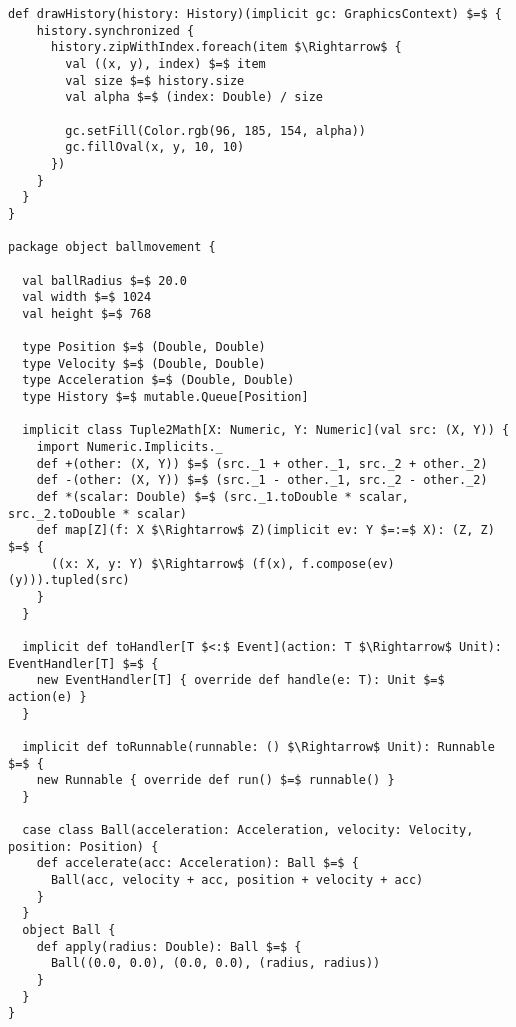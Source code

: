 \begin{lstlisting}[style=ScalaStyle, caption={Ball movement control}, label={lst:ball-full}]
  def drawHistory(history: History)(implicit gc: GraphicsContext) $=$ {
    history.synchronized {
      history.zipWithIndex.foreach(item $\Rightarrow$ {
        val ((x, y), index) $=$ item
        val size $=$ history.size
        val alpha $=$ (index: Double) / size

        gc.setFill(Color.rgb(96, 185, 154, alpha))
        gc.fillOval(x, y, 10, 10)
      })
    }
  }
}

package object ballmovement {

  val ballRadius $=$ 20.0
  val width $=$ 1024
  val height $=$ 768

  type Position $=$ (Double, Double)
  type Velocity $=$ (Double, Double)
  type Acceleration $=$ (Double, Double)
  type History $=$ mutable.Queue[Position]

  implicit class Tuple2Math[X: Numeric, Y: Numeric](val src: (X, Y)) {
    import Numeric.Implicits._
    def +(other: (X, Y)) $=$ (src._1 + other._1, src._2 + other._2)
    def -(other: (X, Y)) $=$ (src._1 - other._1, src._2 - other._2)
    def *(scalar: Double) $=$ (src._1.toDouble * scalar, src._2.toDouble * scalar)
    def map[Z](f: X $\Rightarrow$ Z)(implicit ev: Y $=:=$ X): (Z, Z) $=$ {
      ((x: X, y: Y) $\Rightarrow$ (f(x), f.compose(ev)(y))).tupled(src)
    }
  }
  
  implicit def toHandler[T $<:$ Event](action: T $\Rightarrow$ Unit): EventHandler[T] $=$ {
    new EventHandler[T] { override def handle(e: T): Unit $=$ action(e) }
  }

  implicit def toRunnable(runnable: () $\Rightarrow$ Unit): Runnable $=$ {
    new Runnable { override def run() $=$ runnable() }
  }

  case class Ball(acceleration: Acceleration, velocity: Velocity, position: Position) {
    def accelerate(acc: Acceleration): Ball $=$ {
      Ball(acc, velocity + acc, position + velocity + acc)
    }
  }
  object Ball {
    def apply(radius: Double): Ball $=$ {
      Ball((0.0, 0.0), (0.0, 0.0), (radius, radius))
    }
  }
}
\end{lstlisting}